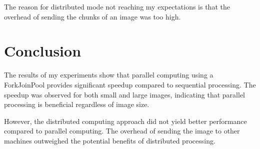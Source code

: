 \documentclass{article}
\begin{document}
\begin{multicols}{2}
    The reason for distributed mode not reaching my expectations is that the overhead of sending the chunks of an image was too high.
    \cite{mattheakis2013significantly}

    \section{Conclusion}

    The results of my experiments show that parallel computing using a ForkJoinPool provides significant speedup compared to sequential processing. The speedup was observed for both small and large images, indicating that parallel processing is beneficial regardless of image size.

    However, the distributed computing approach did not yield better performance compared to parallel computing. The overhead of sending the image to other machines outweighed the potential benefits of distributed processing.

\end{multicols}

\printbibliography[heading=bibintoc, title={References}]
\end{document}
